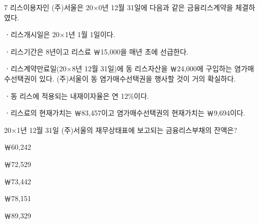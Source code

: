 \begin{question}{7}
리스이용자인 (주)서울은 20×0년 12월 31일에 다음과 같은 금융리스계약을 체결하였다.
\begin{framedtext}
ㆍ리스개시일은 20×1년 1월 1일이다. \par
ㆍ리스기간은 8년이고 리스료 ￦15,000을 매년 초에 선급한다. \par
ㆍ리스계약만료일(20×8년 12월 31일)에 동 리스자산을 ￦24,000에 구입하는 염가매수선택권이 있다. (주)서울이 동 염가매수선택권을 행사할 것이 거의 확실하다. \par
ㆍ동 리스에 적용되는 내재이자율은 연 12\%이다. \par
ㆍ리스료의 현재가치는 ￦83,457이고 염가매수선택권의 현재가치는 ￦9,694이다. \par
\end{framedtext}
20×1년 12월 31일 (주)서울의 재무상태표에 보고되는 금융리스부채의 잔액은? \par
\begin{choices}
  \item ￦60,242
  \item ￦72,529
  \item ￦73,442
  \item ￦78,151
  \item ￦89,329
\end{choices}
\end{question}
\answerall
{}
